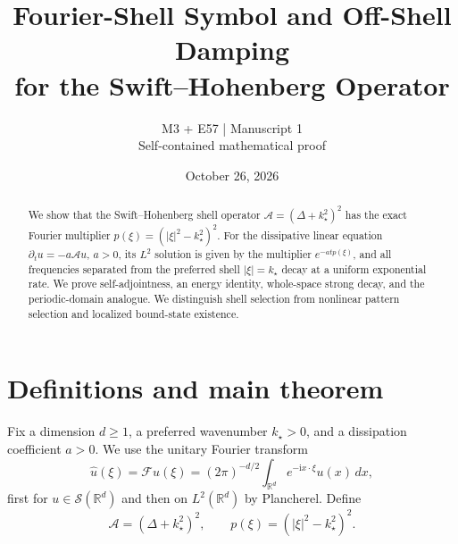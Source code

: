 \documentclass[11pt]{article}
\title{Fourier-Shell Symbol and Off-Shell Damping\\
for the Swift--Hohenberg Operator}
\author{M3 + E57 \quad | \quad Manuscript 1\\[2pt]
\small Self-contained mathematical proof}
\date{October 26, 2026}
\theoremstyle{remark}
\newcommand{\R}{\mathbb{R}}
\newcommand{\sS}{\mathcal{S}}
\newcommand{\sA}{\mathcal{A}}
\newcommand{\sF}{\mathcal{F}}
\newcommand{\ii}{\mathrm{i}}
\newcommand{\abs}[1]{\left\lvert #1\right\rvert}
\begin{document}
\maketitle

\begin{abstract}
We show that the Swift--Hohenberg shell operator
$\sA=(\Delta+k_\star^2)^2$ has the exact Fourier multiplier
$p(\xi)=(\abs{\xi}^2-k_\star^2)^2$.  For the dissipative linear equation
$\partial_tu=-a\sA u$, $a>0$, its $L^2$ solution is given by the multiplier
$e^{-atp(\xi)}$, and all frequencies separated from the preferred shell
$\abs{\xi}=k_\star$ decay at a uniform exponential rate.  We prove
self-adjointness, an energy identity, whole-space strong decay, and the
periodic-domain analogue.  We distinguish shell selection from nonlinear
pattern selection and localized bound-state existence.
\end{abstract}

\section{Definitions and main theorem}

Fix a dimension $d\ge 1$, a preferred wavenumber $k_\star>0$, and a
dissipation coefficient $a>0$.  We use the unitary Fourier transform
\begin{equation}\label{eq:fourier-convention}
\widehat u(\xi)=\sF u(\xi)
=(2\pi)^{-d/2}\int_{\R^d}e^{-\ii x\cdot\xi}u(x)\,dx,
\end{equation}
first for $u\in\sS(\R^d)$ and then on $L^2(\R^d)$ by Plancherel.
Define
\begin{equation}\label{eq:A-def}
\sA=(\Delta+k_\star^2)^2,
\qquad
p(\xi)=(\abs{\xi}^2-k_\star^2)^2.
\end{equation}
\end{document}
